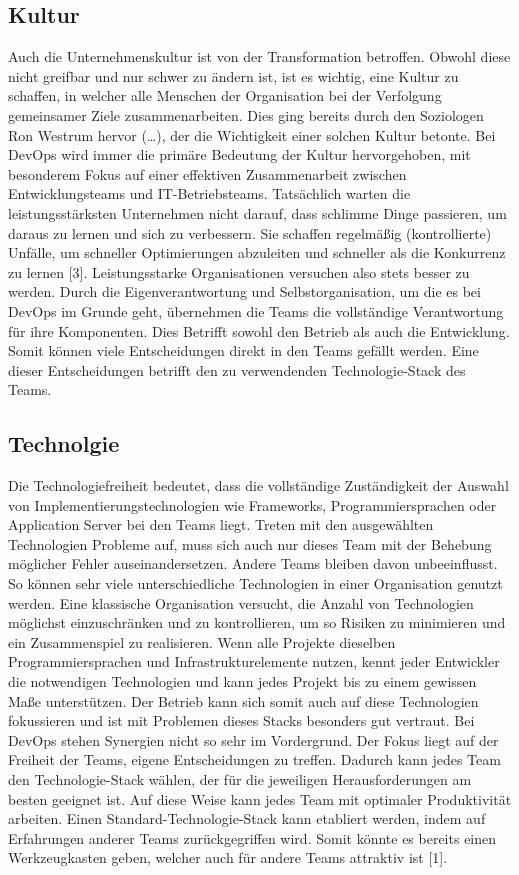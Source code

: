 \subsection{Kultur}
Auch die Unternehmenskultur ist von der Transformation betroffen. Obwohl diese nicht greifbar und nur schwer zu ändern ist, ist es wichtig, eine Kultur zu schaffen, in welcher alle Menschen der Organisation bei der Verfolgung gemeinsamer Ziele zusammenarbeiten. Dies ging bereits durch den Soziologen Ron Westrum hervor (…), der die Wichtigkeit einer solchen Kultur betonte. Bei DevOps wird immer die primäre Bedeutung der Kultur hervorgehoben, mit besonderem Fokus auf einer effektiven Zusammenarbeit zwischen Entwicklungsteams und IT-Betriebsteams. Tatsächlich warten die leistungsstärksten Unternehmen nicht darauf, dass schlimme Dinge passieren, um daraus zu lernen und sich zu verbessern. Sie schaffen regelmäßig (kontrollierte) Unfälle, um schneller Optimierungen abzuleiten und schneller als die Konkurrenz zu lernen [3]. Leistungsstarke Organisationen versuchen also stets besser zu werden. Durch die Eigenverantwortung und Selbstorganisation, um die es bei DevOps im Grunde geht, übernehmen die Teams die vollständige Verantwortung für ihre Komponenten. Dies Betrifft sowohl den Betrieb als auch die Entwicklung. Somit können viele Entscheidungen direkt in den Teams gefällt werden. Eine dieser Entscheidungen betrifft den zu verwendenden Technologie-Stack des Teams.

\subsection{Technolgie}
Die Technologiefreiheit bedeutet, dass die vollständige Zuständigkeit der Auswahl von Implementierungstechnologien wie Frameworks, Programmiersprachen oder Application Server bei den Teams liegt. Treten mit den ausgewählten Technologien Probleme auf, muss sich auch nur dieses Team mit der Behebung möglicher Fehler auseinandersetzen. Andere Teams bleiben davon unbeeinflusst. So können sehr viele unterschiedliche Technologien in einer Organisation genutzt werden. Eine klassische Organisation versucht, die Anzahl von Technologien möglichst einzuschränken und zu kontrollieren, um so Risiken zu minimieren und ein Zusammenspiel zu realisieren. Wenn alle Projekte dieselben Programmiersprachen und Infrastrukturelemente nutzen, kennt jeder Entwickler die notwendigen Technologien und kann jedes Projekt bis zu einem gewissen Maße unterstützen. Der Betrieb kann sich somit auch auf diese Technologien fokussieren und ist mit Problemen dieses Stacks besonders gut vertraut. Bei DevOps stehen Synergien nicht so sehr im Vordergrund. Der Fokus liegt auf der Freiheit der Teams, eigene Entscheidungen zu treffen. Dadurch kann jedes Team den Technologie-Stack wählen, der für die jeweiligen Herausforderungen am besten geeignet ist. Auf diese Weise kann jedes Team mit optimaler Produktivität arbeiten. Einen Standard-Technologie-Stack kann etabliert werden, indem auf Erfahrungen anderer Teams zurückgegriffen wird. Somit könnte es bereits einen Werkzeugkasten geben, welcher auch für andere Teams attraktiv ist [1].


